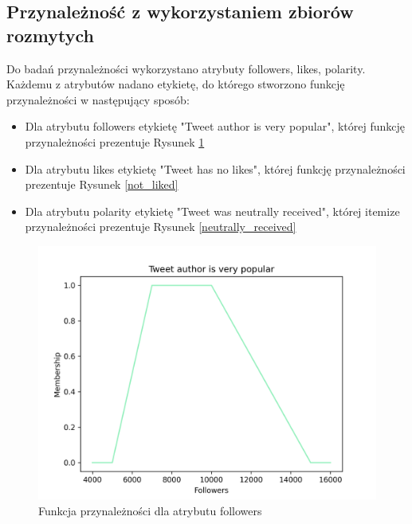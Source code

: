 \documentclass{classrep}
\begin{document}
\subsection{Przynależność z wykorzystaniem zbiorów rozmytych}

Do badań przynależności wykorzystano atrybuty followers, likes, polarity. Każdemu z atrybutów nadano etykietę, do którego stworzono funkcję przynależności w następujący sposób:

\begin{itemize}
    \item Dla atrybutu followers etykietę "Tweet author is very popular", której funkcję przynależności prezentuje Rysunek \ref{very_popular}
    \item Dla atrybutu likes etykietę "Tweet has no likes", której funkcję przynależności prezentuje Rysunek \ref{not_liked}
    \item Dla atrybutu polarity etykietę "Tweet was neutrally received", której itemize przynależności prezentuje Rysunek \ref{neutrally_received}
\end{itemize}

\begin{figure}[H]
    \centering
    \includegraphics[width=1\textwidth]{resources/stage3/Tweet author is very popular.png}
    \caption{Funkcja przynależności dla atrybutu followers}
    \label{very_popular}
\end{figure}
\end{document}
